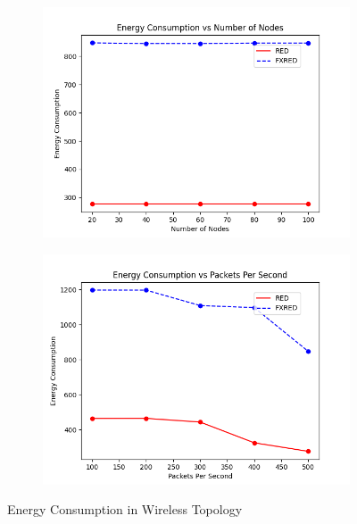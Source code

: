 \documentclass[10pt]{report}
\begin{document}
\begin{figure}
\begin{subfigure}{.5\textwidth}
        \includegraphics[width=1\linewidth]{static/graphs/wireless/Energy Consumption vs Number of Nodes.png}
    \end{subfigure}%
    \begin{subfigure}{.5\textwidth}
        \includegraphics[width=1\linewidth]{static/graphs/wireless/Energy Consumption vs Packets Per Second.png}
    \end{subfigure}
    \caption{Energy Consumption in Wireless Topology}
    \label{fig:wireless_eng_consumption}
\end{figure}
\end{document}
